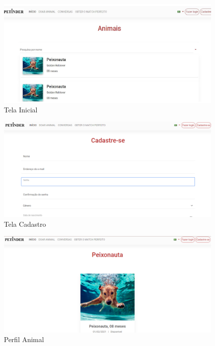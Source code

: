 \begin{apendicesenv}
\begin{flushleft}
\begin{figure}[!htbp]
    \centering
    \caption{\label{Tela Inicial}Tela Inicial}
	\includegraphics[scale=0.50,angle=0]{imagens/TelaInicial.jpg}
\end{figure}

\begin{figure}[!htbp]
    \centering
    \caption{\label{Tela Cadastro}Tela Cadastro}
	\includegraphics[scale=0.50,angle=0]{imagens/TelaCadastro.png}
\end{figure}

\begin{figure}[!htbp]
    \centering
    \caption{\label{Perfil Animal}Perfil Animal}
	\includegraphics[scale=0.50,angle=0]{imagens/PerfilPet.png}
\end{figure}



\end{flushleft}
\end{apendicesenv}

